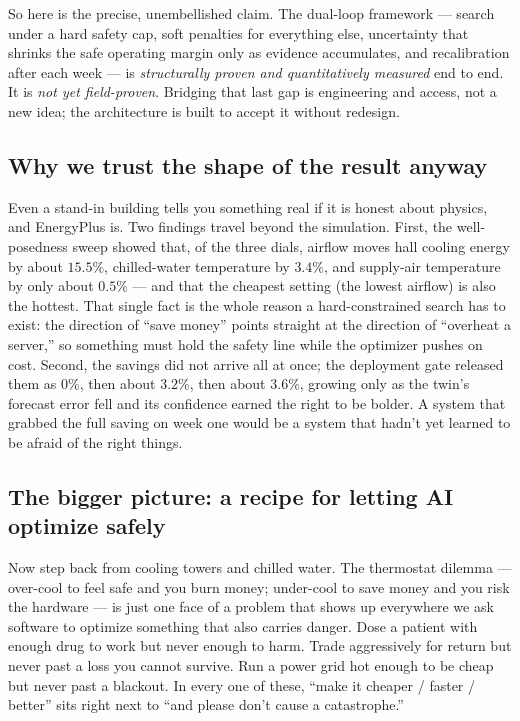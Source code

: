 So here is the precise, unembellished claim. The dual-loop framework --- search under a hard safety cap, soft penalties for everything else, uncertainty that shrinks the safe operating margin only as evidence accumulates, and recalibration after each week --- is \emph{structurally proven and quantitatively measured} end to end. It is \emph{not yet field-proven}. Bridging that last gap is engineering and access, not a new idea; the architecture is built to accept it without redesign.

\subsection{Why we trust the shape of the result anyway}

Even a stand-in building tells you something real if it is honest about physics, and EnergyPlus is. Two findings travel beyond the simulation. First, the well-posedness sweep showed that, of the three dials, airflow moves hall cooling energy by about $15.5\%$, chilled-water temperature by $3.4\%$, and supply-air temperature by only about $0.5\%$ --- and that the cheapest setting (the lowest airflow) is also the hottest. That single fact is the whole reason a hard-constrained search has to exist: the direction of ``save money'' points straight at the direction of ``overheat a server,'' so something must hold the safety line while the optimizer pushes on cost. Second, the savings did not arrive all at once; the deployment gate released them as $0\%$, then about $3.2\%$, then about $3.6\%$, growing only as the twin's forecast error fell and its confidence earned the right to be bolder. A system that grabbed the full saving on week one would be a system that hadn't yet learned to be afraid of the right things.

\subsection{The bigger picture: a recipe for letting AI optimize safely}

Now step back from cooling towers and chilled water. The thermostat dilemma --- over-cool to feel safe and you burn money; under-cool to save money and you risk the hardware --- is just one face of a problem that shows up everywhere we ask software to optimize something that also carries danger. Dose a patient with enough drug to work but never enough to harm. Trade aggressively for return but never past a loss you cannot survive. Run a power grid hot enough to be cheap but never past a blackout. In every one of these, ``make it cheaper / faster / better'' sits right next to ``and please don't cause a catastrophe.''

